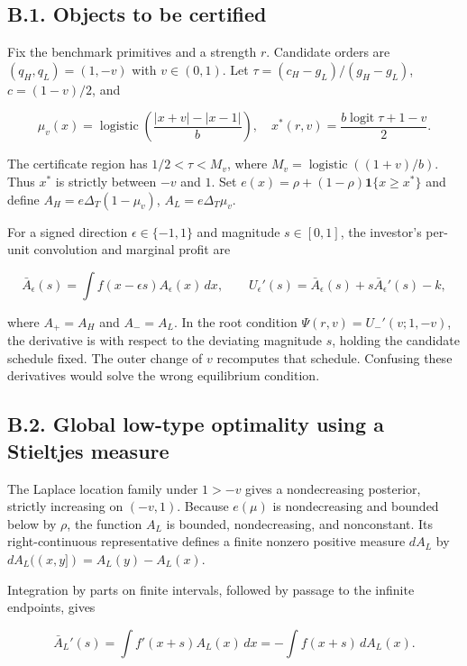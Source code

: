 \documentclass[
  11pt,
]{article}
\begin{document}
\subsection{B.1. Objects to be certified}\label{oa-b-objects}

Fix the benchmark primitives and a strength \(r\). Candidate orders are
\((q_H,q_L)=(1,-v)\) with \(v\in(0,1)\). Let
\(\tau=(c_H-g_L)/(g_H-g_L)\), \(c=(1-v)/2\), and

\[
\mu_v(x)=\operatorname{logistic}\left(\frac{|x+v|-|x-1|}{b}\right),\quad
x^*(r,v)=\frac{b\operatorname{logit}\tau+1-v}{2}.
\tag{OA.65}\label{eq:oa-oa-65}
\]

The certificate region has \(1/2<\tau<M_v\), where
\(M_v=\operatorname{logistic}((1+v)/b)\). Thus \(x^*\) is strictly
between \(-v\) and \(1\). Set \(e(x)=\rho+(1-\rho)\mathbf1\{x\ge x^*\}\)
and define \(A_H=e\Delta_T(1-\mu_v)\), \(A_L=e\Delta_T\mu_v\).

For a signed direction \(\epsilon\in\{-1,1\}\) and magnitude
\(s\in[0,1]\), the investor's per-unit convolution and marginal profit
are

\[
\bar A_\epsilon(s)=\int f(x-\epsilon s)A_\epsilon(x)\,dx,
\qquad U_\epsilon'(s)=\bar A_\epsilon(s)+s\bar A_\epsilon'(s)-k,
\tag{OA.66}\label{eq:oa-oa-66}
\]

where \(A_+=A_H\) and \(A_-=A_L\). In the root condition
\(\Psi(r,v)=U_-'(v;1,-v)\), the derivative is with respect to the
deviating magnitude \(s\), holding the candidate schedule fixed. The
outer change of \(v\) recomputes that schedule. Confusing these
derivatives would solve the wrong equilibrium condition.

\subsection{B.2. Global low-type optimality using a Stieltjes
measure}\label{oa-b-concavity}

The Laplace location family under \(1>-v\) gives a nondecreasing
posterior, strictly increasing on \((-v,1)\). Because \(e(\mu)\) is
nondecreasing and bounded below by \(\rho\), the function \(A_L\) is
bounded, nondecreasing, and nonconstant. Its right-continuous
representative defines a finite nonzero positive measure \(dA_L\) by
\(dA_L((x,y])=A_L(y)-A_L(x)\).

Integration by parts on finite intervals, followed by passage to the
infinite endpoints, gives

\[
\bar A_L'(s)=\int f'(x+s)A_L(x)\,dx=-\int f(x+s)\,dA_L(x).
\tag{OA.67}\label{eq:oa-oa-67}
\]
\end{document}
